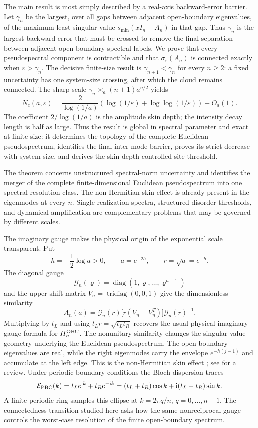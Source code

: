 \documentclass[12pt,anonymous]{iopjournal}
\numberwithin{equation}{section}
\theoremstyle{remark}
\DeclareMathOperator{\diag}{diag}
\DeclareMathOperator{\tridiag}{tridiag}
\newcommand{\ii}{\mathrm i}
\begin{document}
The main result is most simply described by a real-axis backward-error
barrier.  Let \(\gamma_n\) be the largest, over all gaps between adjacent
open-boundary eigenvalues, of the maximum least singular value
\(s_{\min}(xI_n-A_n)\) in that gap.  Thus \(\gamma_n\) is the largest
backward error that must be crossed to remove the final separation between
adjacent open-boundary spectral labels.  We prove that every
pseudospectral component is contractible and that
\(\sigma_\varepsilon(A_n)\) is connected exactly when
\(\varepsilon>\gamma_n\).  The decisive finite-size result is
\(\gamma_{n+1}<\gamma_n\) for every \(n\geq2\): a fixed uncertainty has one
system-size crossing, after which the cloud remains connected.
The sharp scale
\(\gamma_n\asymp_a(n+1)a^{n/2}\) yields
\[
 N_c(a,\varepsilon)=\frac{2}{\log(1/a)}
 \left(\log(1/\varepsilon)+\log\!\log(1/\varepsilon)\right)+O_a(1).
\]
The coefficient \(2/\log(1/a)\) is the amplitude skin depth; the intensity
decay length is half as large.  Thus the result is global in spectral
parameter and exact at finite size: it determines the topology of the
complete Euclidean pseudospectrum, identifies the final inter-mode barrier,
proves its strict decrease with system size, and derives the
skin-depth-controlled site threshold.

The theorem concerns unstructured spectral-norm uncertainty and identifies
the merger of the complete finite-dimensional Euclidean pseudospectrum into
one spectral-resolution class.  The non-Hermitian skin effect is already
present in the eigenmodes at every \(n\).  Single-realization spectra,
structured-disorder thresholds, and dynamical amplification are
complementary problems that may be governed by different scales.

The imaginary gauge makes the physical origin of the exponential scale
transparent.  Put
\[
 h=-\frac12\log a>0,\qquad a=e^{-2h},\qquad
 r=\sqrt a=e^{-h}.
\]
The diagonal gauge
\[
 \mathcal G_n(\varrho)=\diag(1,\varrho,\ldots,\varrho^{n-1})
\]
and the upper-shift matrix \(V_n=\tridiag(0,0,1)\) give the
dimensionless similarity
\[
 A_n(a)=\mathcal G_n(r)\bigl[r(V_n+V_n^T)\bigr]
 \mathcal G_n(r)^{-1}.
\]
Multiplying by \(t_L\) and using \(t_Lr=\sqrt{t_Lt_R}\) recovers the
usual physical imaginary-gauge formula for \(H_n^{\rm OBC}\).
The nonunitary similarity changes the singular-value geometry underlying
the Euclidean pseudospectrum.
The open-boundary eigenvalues are real, while the right
eigenmodes carry the envelope \(e^{-h(j-1)}\) and accumulate at the left
edge.  This is the non-Hermitian skin effect
\cite{OkumaEtAl2020,YaoWang2018,YokomizoMurakami2019}; see
\cite{ZhangEtAl2022} for a review.  Under periodic boundary conditions the
Bloch dispersion traces
\[
 \mathcal E_{\rm PBC}(k)=t_Le^{\ii k}+t_Re^{-\ii k}
 =(t_L+t_R)\cos k+\ii(t_L-t_R)\sin k.
\]
A finite periodic ring samples this ellipse at
\(k=2\pi q/n\), \(q=0,\ldots,n-1\).
The connectedness transition studied here asks how the same nonreciprocal
gauge controls the worst-case resolution of the finite open-boundary
spectrum.
\end{document}
